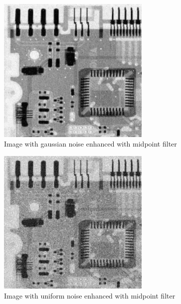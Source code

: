 \documentclass[10pt]{article}
\begin{document}
\clearpage
\begin{figure}[!ht]
	\centering
	\includegraphics[height=200pt]{./ex4/gaussmid.jpg}
	\caption{Image with gaussian noise enhanced with midpoint filter}
\end{figure}
\begin{figure}[!ht]
	\centering
	\includegraphics[height=200pt]{./ex4/unimid.jpg}
	\caption{Image with uniform noise enhanced with midpoint filter}
\end{figure}
\end{document}
